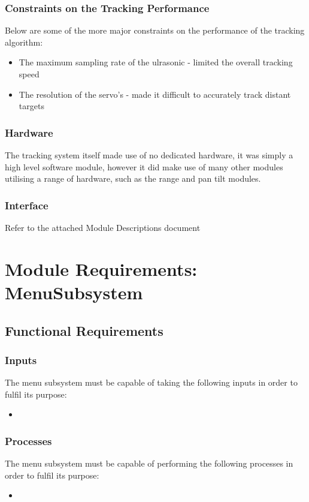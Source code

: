 \documentclass[]{report}
\begin{document}
\subsubsection{Constraints on the Tracking Performance}
Below are some of the more major constraints on the performance of the tracking algorithm:
\begin{itemize}
	\item The maximum sampling rate of the ulrasonic - limited the overall tracking speed
	\item The resolution of the servo's - made it difficult to accurately track distant targets
\end{itemize}

\subsubsection{Hardware}
The tracking system itself made use of no dedicated hardware, it was simply a high level software module, however it did make use of many other modules utilising a range of hardware, such as the range and pan tilt modules.

\subsubsection{Interface}
Refer to the attached Module Descriptions document

\section{Module Requirements: MenuSubsystem}
\subsection{Functional Requirements}
\subsubsection{Inputs}
The menu subsystem must be capable of taking the following inputs in order to fulfil its purpose:
\begin{itemize}
	\item 
\end{itemize}

\subsubsection{Processes}
The menu subsystem must be capable of performing the following processes in order to fulfil its purpose:
\begin{itemize}
	\item 
\end{itemize}
\end{document}
